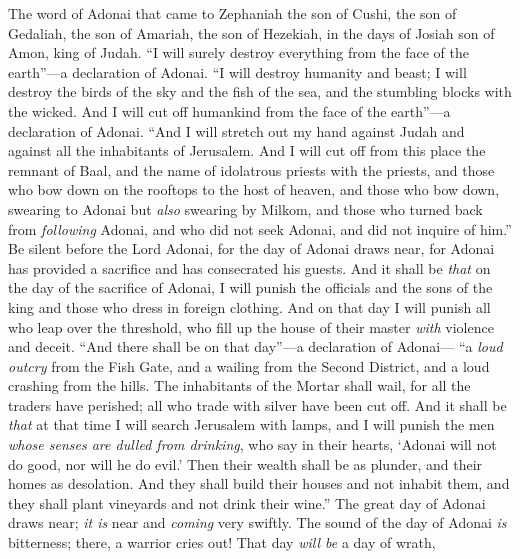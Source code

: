 
\begin{biblechapter} %
 The word of Adonai that came to Zephaniah the son of Cushi, the son of Gedaliah, the son of Amariah, the son of Hezekiah, in the days of Josiah son of Amon, king of Judah.
\verse “I will surely destroy everything 
from the face of the earth”—a declaration of Adonai.
\verse “I will destroy humanity and beast; 
I will destroy the birds of the sky 
and the fish of the sea, 
and the stumbling blocks with the wicked. 
And I will cut off humankind 
from the face of the earth”—a declaration of Adonai.
\verse “And I will stretch out my hand against Judah 
and against all the inhabitants of Jerusalem. 
And I will cut off from this place 
the remnant of Baal, 
and the name of idolatrous priests with the priests,
\verse and those who bow down on the rooftops 
to the host of heaven, 
and those who bow down, swearing to Adonai 
but \textit{also} swearing by Milkom,
\verse and those who turned back from \textit{following} Adonai, 
and who did not seek Adonai, 
and did not inquire of him.”
\verse Be silent before the Lord Adonai, 
for the day of Adonai draws near, 
for Adonai has provided a sacrifice 
and has consecrated his guests.
\verse And it shall be \textit{that} on the day of the sacrifice of Adonai, 
I will punish the officials 
and the sons of the king 
and those who dress in foreign clothing.
\verse And on that day I will punish 
all who leap over the threshold, 
who fill up the house of their master 
\textit{with} violence and deceit.
\verse “And there shall be on that day”—a declaration of Adonai— 
“a \textit{loud outcry} from the Fish Gate, 
and a wailing from the Second District, 
and a loud crashing from the hills.
\verse The inhabitants of the Mortar shall wail, 
for all the traders have perished; 
all who trade with silver have been cut off.
\verse And it shall be \textit{that} at that time 
I will search Jerusalem with lamps, 
and I will punish the men 
\textit{whose senses are dulled from drinking}, 
who say in their hearts, 
‘Adonai will not do good, nor will he do evil.’
\verse Then their wealth shall be as plunder, 
and their homes as desolation. 
And they shall build their houses and not inhabit them, 
and they shall plant vineyards and not drink their wine.”
\verse The great day of Adonai draws near; 
\textit{it is} near and \textit{coming} very swiftly. 
The sound of the day of Adonai \textit{is} bitterness; 
there, a warrior cries out!
\verse That day \textit{will be} a day of wrath, 

\end{biblechapter}
